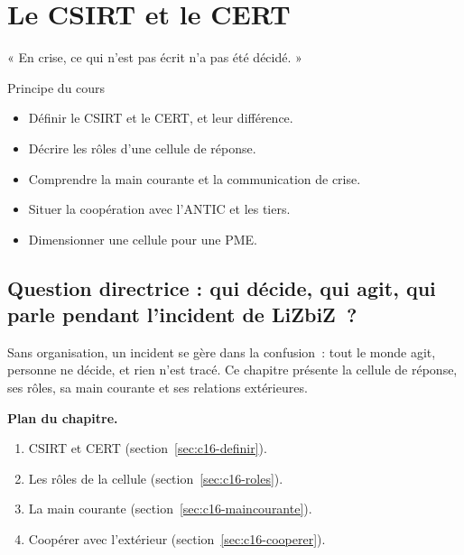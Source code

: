 
\chapter{Le CSIRT et le CERT}
\label{chap:csirt}

\epigraph{%
    « En crise, ce qui n'est pas écrit n'a pas été décidé. »%
}{Principe du cours}


\begin{boxobjectifs}
\begin{itemize}
    \item Définir le CSIRT et le CERT, et leur différence.
    \item Décrire les rôles d'une cellule de réponse.
    \item Comprendre la main courante et la communication de crise.
    \item Situer la coopération avec l'ANTIC et les tiers.
    \item Dimensionner une cellule pour une PME.
\end{itemize}
\end{boxobjectifs}

\bigskip

\section*{Question directrice : qui décide, qui agit, qui parle pendant l'incident de LiZbiZ~?}

Sans organisation, un incident se gère dans la confusion~: tout le monde
agit, personne ne décide, et rien n'est tracé. Ce chapitre présente la
cellule de réponse, ses rôles, sa main courante et ses relations
extérieures.

\medskip
\textbf{Plan du chapitre.}
\begin{enumerate}
    \item CSIRT et CERT (section~\ref{sec:c16-definir}).
    \item Les rôles de la cellule (section~\ref{sec:c16-roles}).
    \item La main courante (section~\ref{sec:c16-maincourante}).
    \item Coopérer avec l'extérieur (section~\ref{sec:c16-cooperer}).
\end{enumerate}

